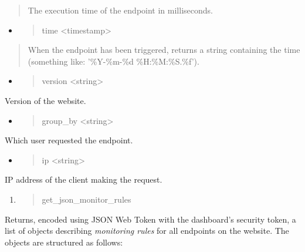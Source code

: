 \begin{quote}
The execution time of the endpoint in milliseconds.
\end{quote}

\begin{itemize}
\item
  \begin{quote}
  time \textless{}timestamp\textgreater{}
  \end{quote}
\end{itemize}

\begin{quote}
When the endpoint has been triggered, returns a string containing the
time (something like: '\%Y-\%m-\%d \%H:\%M:\%S.\%f').
\end{quote}

\begin{itemize}
\item
  \begin{quote}
  version \textless{}string\textgreater{}
  \end{quote}
\end{itemize}

Version of the website.

\begin{itemize}
\item
  \begin{quote}
  group\_by \textless{}string\textgreater{}
  \end{quote}
\end{itemize}

Which user requested the endpoint.

\begin{itemize}
\item
  \begin{quote}
  ip \textless{}string\textgreater{}
  \end{quote}
\end{itemize}

IP address of the client making the request.

\begin{enumerate}
\def\labelenumi{\arabic{enumi}.}
\setcounter{enumi}{2}
\item
  \begin{quote}
  get\_json\_monitor\_rules
  \end{quote}
\end{enumerate}

Returns, encoded using JSON Web Token with the dashboard's security
token, a list of objects describing \emph{monitoring rules} for all
endpoints on the website. The objects are structured as follows:

